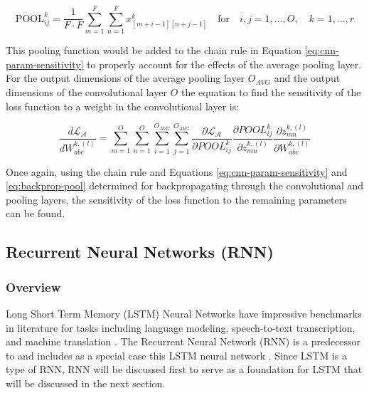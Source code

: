 \begin{equation}
    \text{POOL}_{ij}^k = \frac{1}{F \cdot F} \sum_{m=1}^{F} \sum_{n=1}^{F} x_{[m+i-1][n+j-1]}^k \quad \text{for} \quad i,j = 1,...,O, \quad k = 1,...,r
\end{equation}

This pooling function would be added to the chain rule in Equation \ref{eq:cnn-param-sensitivity} to properly account for the effects of the average pooling layer. For the output dimensions of the average pooling layer $O_{AVG}$ and the output dimensions of the convolutional layer $O$ the equation to find the sensitivity of the loss function to a weight in the convolutional layer is:

\begin{equation}
    \frac{d\mathcal{L}_\mathcal{A}}{dW_{abc}^{k, (l)}} = \sum_{m=1}^{O} \sum_{n=1}^{O} \sum_{i=1}^{O_{AVG}} \sum_{j=1}^{O_{AVG}} \frac{\partial \mathcal{L}_\mathcal{A}}{\partial POOL_{ij}^k} \frac{\partial POOL_{ij}^k}{\partial z_{mn}^{k, (l)}} \frac{\partial z_{mn}^{k, (l)}}{\partial W_{abc}^{k, (l)}}
\end{equation}

Once again, using the chain rule and Equations \ref{eq:cnn-param-sensitivity} and \ref{eq:backprop-pool} determined for backpropagating through the convolutional and pooling layers, the sensitivity of the loss function to the remaining parameters can be found.

\subsection{Recurrent Neural Networks (RNN)}

\subsubsection{Overview}
Long Short Term Memory (LSTM) Neural Networks have impressive benchmarks in literature for tasks including language modeling, speech-to-text transcription, and machine translation \cite{sherstinskyFundamentalsRecurrentNeural2020a}. The Recurrent Neural Network (RNN) is a predecessor to and includes as a special case this LSTM neural network \cite{sherstinskyFundamentalsRecurrentNeural2020a}. Since LSTM is a type of RNN, RNN will be discussed first to serve as a foundation for LSTM that will be discussed in the next section.

